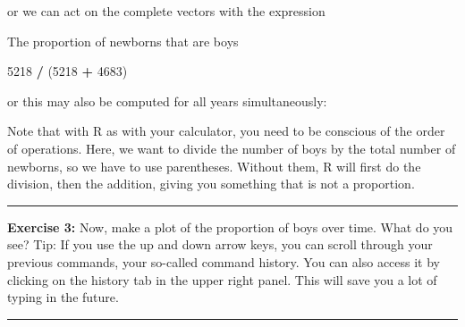\documentclass[]{book}
\newenvironment{Shaded}{\begin{snugshade}}{\end{snugshade}}
\newcommand{\DecValTok}[1]{\textcolor[rgb]{0.00,0.00,0.81}{#1}}
\newcommand{\NormalTok}[1]{#1}
\newcommand{\OperatorTok}[1]{\textcolor[rgb]{0.81,0.36,0.00}{\textbf{#1}}}
\newcommand{\StringTok}[1]{\textcolor[rgb]{0.31,0.60,0.02}{#1}}
\theoremstyle{definition}
\theoremstyle{definition}
\theoremstyle{definition}
\theoremstyle{remark}
\begin{document}
or we can act on the complete vectors with the expression

\begin{Shaded}
\end{Shaded}

The proportion of newborns that are boys

\begin{Shaded}
\begin{Highlighting}[]
\DecValTok{5218} \OperatorTok{/}\StringTok{ }\NormalTok{(}\DecValTok{5218} \OperatorTok{+}\StringTok{ }\DecValTok{4683}\NormalTok{)}
\end{Highlighting}
\end{Shaded}

or this may also be computed for all years simultaneously:

\begin{Shaded}
\end{Shaded}

Note that with R as with your calculator, you need to be conscious of
the order of operations. Here, we want to divide the number of boys by
the total number of newborns, so we have to use parentheses. Without
them, R will first do the division, then the addition, giving you
something that is not a proportion.

\begin{center}\rule{0.5\linewidth}{\linethickness}\end{center}

\textbf{Exercise 3:} Now, make a plot of the proportion of boys over
time. What do you see? Tip: If you use the up and down arrow keys, you
can scroll through your previous commands, your so-called command
history. You can also access it by clicking on the history tab in the
upper right panel. This will save you a lot of typing in the future.

\begin{center}\rule{0.5\linewidth}{\linethickness}\end{center}
\end{document}
